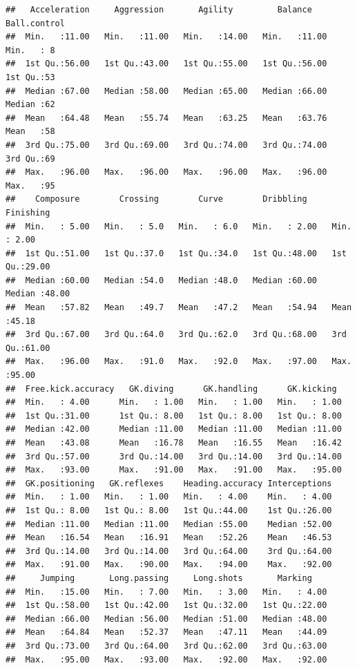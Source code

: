 \documentclass[
]{article}
\theoremstyle{definition}
\theoremstyle{definition}
\theoremstyle{definition}
\theoremstyle{definition}
\theoremstyle{remark}
\begin{document}
\begin{verbatim}
##   Acceleration     Aggression       Agility         Balance       Ball.control
##  Min.   :11.00   Min.   :11.00   Min.   :14.00   Min.   :11.00   Min.   : 8   
##  1st Qu.:56.00   1st Qu.:43.00   1st Qu.:55.00   1st Qu.:56.00   1st Qu.:53   
##  Median :67.00   Median :58.00   Median :65.00   Median :66.00   Median :62   
##  Mean   :64.48   Mean   :55.74   Mean   :63.25   Mean   :63.76   Mean   :58   
##  3rd Qu.:75.00   3rd Qu.:69.00   3rd Qu.:74.00   3rd Qu.:74.00   3rd Qu.:69   
##  Max.   :96.00   Max.   :96.00   Max.   :96.00   Max.   :96.00   Max.   :95   
##    Composure        Crossing        Curve        Dribbling       Finishing    
##  Min.   : 5.00   Min.   : 5.0   Min.   : 6.0   Min.   : 2.00   Min.   : 2.00  
##  1st Qu.:51.00   1st Qu.:37.0   1st Qu.:34.0   1st Qu.:48.00   1st Qu.:29.00  
##  Median :60.00   Median :54.0   Median :48.0   Median :60.00   Median :48.00  
##  Mean   :57.82   Mean   :49.7   Mean   :47.2   Mean   :54.94   Mean   :45.18  
##  3rd Qu.:67.00   3rd Qu.:64.0   3rd Qu.:62.0   3rd Qu.:68.00   3rd Qu.:61.00  
##  Max.   :96.00   Max.   :91.0   Max.   :92.0   Max.   :97.00   Max.   :95.00  
##  Free.kick.accuracy   GK.diving      GK.handling      GK.kicking   
##  Min.   : 4.00      Min.   : 1.00   Min.   : 1.00   Min.   : 1.00  
##  1st Qu.:31.00      1st Qu.: 8.00   1st Qu.: 8.00   1st Qu.: 8.00  
##  Median :42.00      Median :11.00   Median :11.00   Median :11.00  
##  Mean   :43.08      Mean   :16.78   Mean   :16.55   Mean   :16.42  
##  3rd Qu.:57.00      3rd Qu.:14.00   3rd Qu.:14.00   3rd Qu.:14.00  
##  Max.   :93.00      Max.   :91.00   Max.   :91.00   Max.   :95.00  
##  GK.positioning   GK.reflexes    Heading.accuracy Interceptions  
##  Min.   : 1.00   Min.   : 1.00   Min.   : 4.00    Min.   : 4.00  
##  1st Qu.: 8.00   1st Qu.: 8.00   1st Qu.:44.00    1st Qu.:26.00  
##  Median :11.00   Median :11.00   Median :55.00    Median :52.00  
##  Mean   :16.54   Mean   :16.91   Mean   :52.26    Mean   :46.53  
##  3rd Qu.:14.00   3rd Qu.:14.00   3rd Qu.:64.00    3rd Qu.:64.00  
##  Max.   :91.00   Max.   :90.00   Max.   :94.00    Max.   :92.00  
##     Jumping       Long.passing     Long.shots       Marking     
##  Min.   :15.00   Min.   : 7.00   Min.   : 3.00   Min.   : 4.00  
##  1st Qu.:58.00   1st Qu.:42.00   1st Qu.:32.00   1st Qu.:22.00  
##  Median :66.00   Median :56.00   Median :51.00   Median :48.00  
##  Mean   :64.84   Mean   :52.37   Mean   :47.11   Mean   :44.09  
##  3rd Qu.:73.00   3rd Qu.:64.00   3rd Qu.:62.00   3rd Qu.:63.00  
##  Max.   :95.00   Max.   :93.00   Max.   :92.00   Max.   :92.00  

\end{verbatim}
\end{document}
